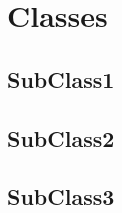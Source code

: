 \clearpage
\section{Classes}
\lipsum[1]
\subsection{SubClass1}
\lipsum[1-2]
\newpage
\subsection{SubClass2}
\lipsum[1-3]
\newpage
\subsection{SubClass3}
\lipsum[1-2]